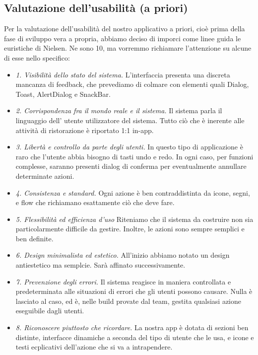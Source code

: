 \subsection{Valutazione dell'usabilità (a priori)}

    \begin{flushleft}
       Per la valutazione dell'usabilità del nostro applicativo a priori, cioè prima della fase di sviluppo vera a propria,
       abbiamo deciso di imporci come linee guida le euristiche di Nielsen.
       Ne sono 10, ma vorremmo richiamare l'attenzione su alcune di esse nello specifico:
        \begin{itemize}
            \item  \emph{1. Visibilità dello stato del sistema.} L'interfaccia presenta una discreta mancanza di feedback, che prevediamo di colmare con elementi quali Dialog, Toast, AlertDialog e SnackBar.
            \item  \emph{2. Corrispondenza fra il mondo reale e il sistema.} Il sistema parla il linguaggio dell' utente utilizzatore del sistema. Tutto ciò che è inerente alle attività di ristorazione è riportato 1:1 in-app.
            \item  \emph{3. Libertà e controllo da parte degli utenti.} In questo tipo di applicazione è raro che l'utente abbia bisogno di tasti undo e redo. In ogni caso, per funzioni complesse, saranno presenti dialog di conferma per eventualmente annullare determinate azioni.
            \item  \emph{4. Consistenza e standard.} Ogni azione è ben contraddistinta da icone, segni, e flow che richiamano esattamente ciò che deve fare. 
            \item  \emph{5. Flessibilità ed efficienza d’uso} Riteniamo che il sistema da costruire non sia particolarmente difficile da gestire. Inoltre, le azioni sono sempre semplici e ben definite.
            \item  \emph{6. Design minimalista ed estetico.} All'inizio abbiamo notato un design antiestetico ma semplcie. Sarà affinato successivamente.
            \item  \emph{7. Prevenzione degli errori.} Il sistema reagisce in maniera controllata e predeterminata alle situazioni di errori che gli utenti possono causare. Nulla è lasciato al caso, ed è, nelle build provate dal team, gestita qualsiasi azione eseguibile dagli utenti.
            \item  \emph{8. Riconoscere piuttosto che ricordare.} La nostra app è dotata di sezioni ben distinte, interfacce dinamiche a seconda del tipo di utente che le usa, e icone e testi ecplicativi dell'azione che si va a intrapendere.

\end{itemize}
\end{flushleft}

